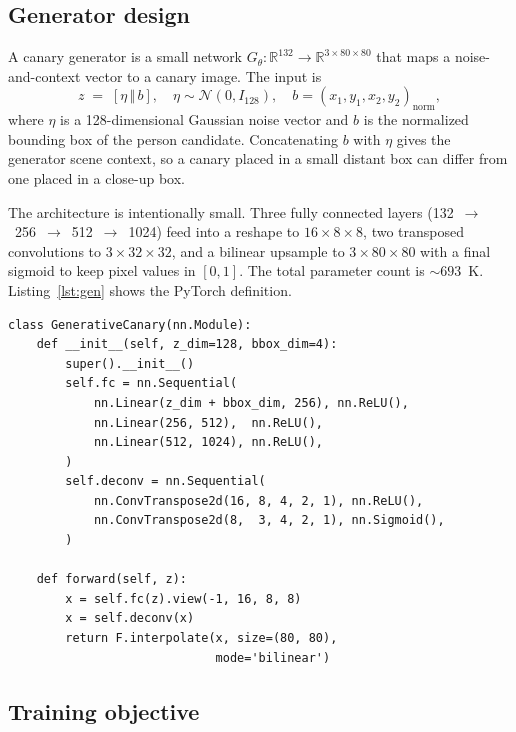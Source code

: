 \documentclass[conference]{IEEEtran}
\begin{document}
\subsection{Generator design}
\label{ssec:design}

A canary generator is a small network $G_\theta : \mathbb{R}^{132}
\to \mathbb{R}^{3 \times 80 \times 80}$ that maps a noise-and-context
vector to a canary image. The input is
\begin{equation}
    z \;=\; [\eta \,\Vert\, b], \quad
    \eta \sim \mathcal{N}(0, I_{128}), \quad
    b = (x_1, y_1, x_2, y_2)_{\text{norm}},
\end{equation}
where $\eta$ is a 128-dimensional Gaussian noise vector and $b$ is the
normalized bounding box of the person candidate. Concatenating $b$ with
$\eta$ gives the generator scene context, so a canary placed in a small
distant box can differ from one placed in a close-up box.

The architecture is intentionally small. Three fully connected layers
(132~$\to$~256~$\to$~512~$\to$~1024) feed into a reshape to
$16\times8\times8$, two transposed convolutions to $3\times32\times32$,
and a bilinear upsample to $3\times80\times80$ with a final sigmoid to
keep pixel values in $[0,1]$. The total parameter count is
${\sim}693$~K. Listing~\ref{lst:gen} shows the PyTorch definition.

\begin{lstlisting}[caption={Generative canary architecture
(${\sim}693$~K parameters).}, label={lst:gen}]
class GenerativeCanary(nn.Module):
    def __init__(self, z_dim=128, bbox_dim=4):
        super().__init__()
        self.fc = nn.Sequential(
            nn.Linear(z_dim + bbox_dim, 256), nn.ReLU(),
            nn.Linear(256, 512),  nn.ReLU(),
            nn.Linear(512, 1024), nn.ReLU(),
        )
        self.deconv = nn.Sequential(
            nn.ConvTranspose2d(16, 8, 4, 2, 1), nn.ReLU(),
            nn.ConvTranspose2d(8,  3, 4, 2, 1), nn.Sigmoid(),
        )

    def forward(self, z):
        x = self.fc(z).view(-1, 16, 8, 8)
        x = self.deconv(x)
        return F.interpolate(x, size=(80, 80),
                             mode='bilinear')
\end{lstlisting}

\subsection{Training objective}
\end{document}

